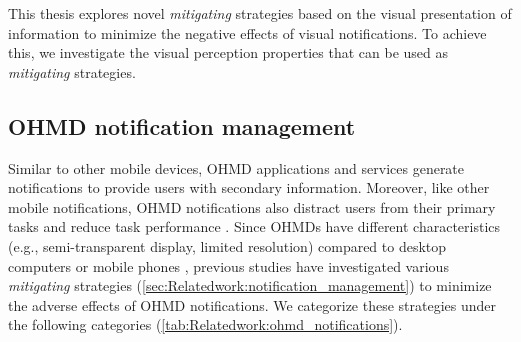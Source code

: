 This thesis explores novel \textit{mitigating} strategies based on the visual presentation of information to minimize the negative effects of visual notifications. To achieve this, we investigate the visual perception properties that can be used as \textit{mitigating} strategies.



\subsection{OHMD notification management}
\label{sec:Relatedwork:ohmd_notification_management}


Similar to other mobile devices, OHMD applications and services generate notifications to provide users with secondary information. Moreover, like other mobile notifications, OHMD notifications also distract users from their primary tasks and reduce task performance \cite{lucero_notifeye_2014, mcatamney_examination_2006}. Since OHMDs have different characteristics (e.g., semi-transparent display, limited resolution) compared to desktop computers or mobile phones \cite{stephanidis_properties_2015, zhu_bishare_2020, yeh_head_2003, vadas_reading_2006, polonen_near_eye_2009, zhou_ubiquitous_2019}, previous studies have investigated various \textit{mitigating} strategies (\autoref{sec:Relatedwork:notification_management}) to minimize the adverse effects of OHMD notifications. We categorize these strategies under the following categories (\autoref{tab:Relatedwork:ohmd_notifications}).

